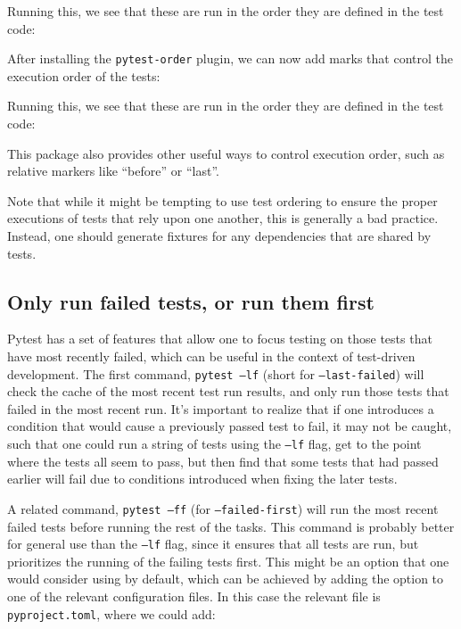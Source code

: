 

Running this, we see that these are run in the order they are defined in the test code:



After installing the \texttt{pytest-order} plugin, we can now add marks that control the execution order of the tests:



Running this, we see that these are run in the order they are defined in the test code:



This package also provides other useful ways to control execution order, such as relative markers like ``before'' or ``last''.

Note that while it might be tempting to use test ordering to ensure the proper executions of tests that rely upon one another, this is generally a bad practice.
Instead, one should generate fixtures for any dependencies that are shared by tests.

\subsection{Only run failed tests, or run them first}

Pytest has a set of features that allow one to focus testing on those tests that have most recently failed, which can be useful in the context of test-driven development.
The first command, \texttt{pytest --lf} (short for \texttt{--last-failed}) will check the cache of the most recent test run results, and only run those tests that failed in the most recent run.
It's important to realize that if one introduces a condition that would cause a previously passed test to fail, it may not be caught, such that one could run a string of tests using the \texttt{--lf} flag, get to the point where the tests all seem to pass, but then find that some tests that had passed earlier will fail due to conditions introduced when fixing the later tests.

A related command, \texttt{pytest --ff} (for \texttt{--failed-first}) will run the most recent failed tests before running the rest of the tasks.
This command is probably better for general use than the \texttt{--lf} flag, since it ensures that all tests are run, but prioritizes the running of the failing tests first.
This might be an option that one would consider using by default, which can be achieved by adding the option to one of the relevant configuration files.
In this case the relevant file is \texttt{pyproject.toml}, where we could add:


